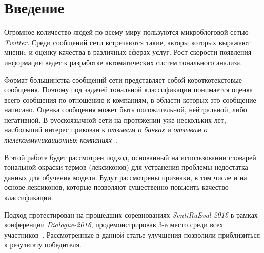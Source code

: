 \section{Введение}
Огромное количество людей по всему миру пользуются микроблоговой сетью
{\it Twitter}.
Среди сообщений сети встречаются такие, авторы которых выражают мнениe и оценку
качества в различных сферах услуг.
Рост скорости появления информации ведет к разработке автоматических систем
тонального анализа.

Формат большинства сообщений сети представляет собой короткотекстовые
сообщения. Поэтому под задачей тональной классификации понимается оценка всего
сообщения по отношению к компаниям, в области которых это сообщение написано.
Оценка сообщения может быть положительной, нейтральной, либо негативной.
В русскоязычной сети на протяжении уже нескольких лет, наибольший интерес прикован к
{\it отзывам о банках} и {\it отзывам о телекоммуникационных компаниях}~\cite{tonalityAnalysis}.

В этой работе будет рассмотрен подход, основанный на использовании
словарей тональной окраски термов (лексиконов) для устранения проблемы недостатка
данных для обучения модели.
Будут рассмотрены признаки, в том числе и на основе лексиконов, которые позволяют
существенно повысить качество классификации.

Подход протестирован на прошедших соревнованиях {\it SentiRuEval-2016}
в рамках конференции {\it Dialogue-2016},
продемонстрировав 3-e место среди всех участников~\cite{dialog2016}.
Рассмотренные в данной статье улучшения позволили приблизиться к результату
победителя.
